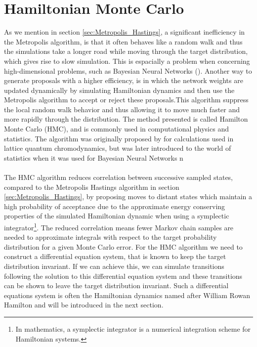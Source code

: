 \section{Hamiltonian Monte Carlo}
As we mention in section \ref{sec:Metropolis_Hastings}, a significant inefficiency in the Metropolis algorithm, is that it often behaves like a random walk and thus the simulations take a longer road while moving through the target distribution, which gives rise to slow simulation. This is espacially a problem when concerning high-dimensional problems, such as Bayesian Neural Networks (\cite{neal2012bayesian}).
Another way to generate proposals with a higher efficiency, is in which the network weights are updated dynamically by simulating Hamiltonian dynamics and then use the Metropolis algorithm to accept or reject these proposals.This algorithm suppress the local random walk behavior and thus allowing it to move much faster and more rapidly through the distribution. The method presented is called Hamilton Monte Carlo (HMC), and is commonly used in computational physics and statistics. The algorithm was originally proposed by \cite{Duane1987216} for calculations used in lattice quantum chromodynamics, but was later introduced to the world of statistics when it was used for Bayesian Neural Networks n \cite{neal2012bayesian}\\
\\
The HMC algorithm reduces correlation between successive sampled states, compared to the Metropolis Hastings algorithm in section \ref{sec:Metropolis_Hastings}, by proposing moves to distant states which maintain a high probability of acceptance due to the approximate energy conserving properties of the simulated Hamiltonian dynamic when using a symplectic integrator\footnote{In mathematics, a symplectic integrator is a numerical integration scheme for Hamiltonian systems.}. The reduced correlation means fewer Markov chain samples are needed to approximate integrals with respect to the target probability distribution for a given Monte Carlo error. For the HMC algorithm we need to construct a differential equation system, that is known to keep the target distribution invariant. If we can achieve this, we can simulate transitions following the solution to this differential equation system and these transitions can be shown to leave the target distribution invariant. Such a differential equations system is often the Hamiltonian dynamics named after William Rowan Hamilton and will be introduced in the next section. 

